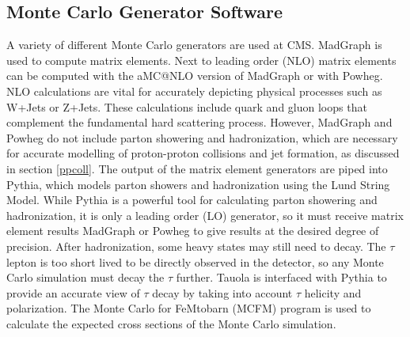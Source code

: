 \documentclass[oneside, letterpaper, oldfontcommands]{memoir}
\begin{document}
\subsection{Monte Carlo Generator Software}\label{mcsoftware}

\qquad A variety of different Monte Carlo generators are used at CMS. {\sc MadGraph} \cite{Alwall:2014hca} is used to compute matrix elements. Next to leading order (NLO) matrix elements can be computed with the aMC@NLO\cite{Alwall:2014hca} version of {\sc MadGraph} or with {\sc Powheg}\cite{Alioli:2010xd, Frixione:2007vw, Nason:2004rx}. NLO calculations are vital for accurately depicting physical processes such as W+Jets or Z+Jets. These calculations include quark and gluon loops that complement the fundamental hard scattering process. However, {\sc MadGraph} and {\sc Powheg} do not include parton showering and hadronization, which are necessary for accurate modelling of proton-proton collisions and jet formation, as discussed in section \ref{ppcoll}. The output of the matrix element generators are piped into {\sc Pythia}, which models parton showers and hadronization using the Lund String Model. While {\sc Pythia} is a powerful tool for calculating parton showering and hadronization, it is only a leading order (LO) generator, so it must receive matrix element results {\sc MadGraph} or {\sc Powheg} to give results at the desired degree of precision. After hadronization, some heavy states may still need to decay. The $\tau$ lepton is too short lived to be directly observed in the detector, so any Monte Carlo simulation must decay the $\tau$ further. 
{\sc Tauola} \cite{Was:2011tv} is interfaced with {\sc Pythia} to provide an accurate view of $\tau$ decay by taking into account $\tau$ helicity and polarization. The Monte Carlo for FeMtobarn (MCFM) program \cite{Campbell:1999ah}\cite{Campbell:2011bn}\cite{Campbell:2015qma} is used to calculate the expected cross sections of the Monte Carlo simulation. 
\end{document}
